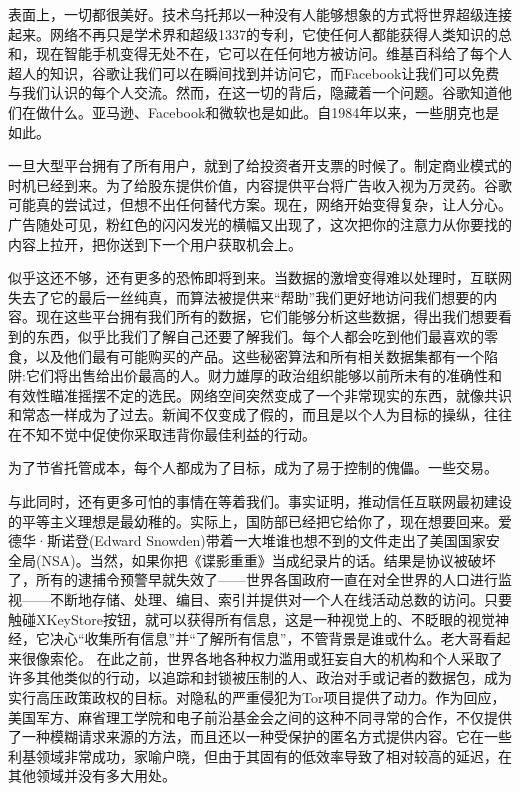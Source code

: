 表面上，一切都很美好。技术乌托邦以一种没有人能够想象的方式将世界超级连接起来。网络不再只是学术界和超级1337的专利，它使任何人都能获得人类知识的总和，现在智能手机变得无处不在，它可以在任何地方被访问。维基百科给了每个人超人的知识，谷歌让我们可以在瞬间找到并访问它，而Facebook让我们可以免费与我们认识的每个人交流。然而，在这一切的背后，隐藏着一个问题。谷歌知道他们在做什么。亚马逊、Facebook和微软也是如此。自1984年以来，一些朋克也是如此。

一旦大型平台拥有了所有用户，就到了给投资者开支票的时候了。制定商业模式的时机已经到来。为了给股东提供价值，内容提供平台将广告收入视为万灵药。谷歌可能真的尝试过，但想不出任何替代方案。现在，网络开始变得复杂，让人分心。广告随处可见，粉红色的闪闪发光的横幅又出现了，这次把你的注意力从你要找的内容上拉开，把你送到下一个用户获取机会上。

似乎这还不够，还有更多的恐怖即将到来。当数据的激增变得难以处理时，互联网失去了它的最后一丝纯真，而算法被提供来“帮助”我们更好地访问我们想要的内容。现在这些平台拥有我们所有的数据，它们能够分析这些数据，得出我们想要看到的东西，似乎比我们了解自己还要了解我们。每个人都会吃到他们最喜欢的零食，以及他们最有可能购买的产品。这些秘密算法和所有相关数据集都有一个陷阱:它们将出售给出价最高的人。财力雄厚的政治组织能够以前所未有的准确性和有效性瞄准摇摆不定的选民。网络空间突然变成了一个非常现实的东西，就像共识和常态一样成为了过去。新闻不仅变成了假的，而且是以个人为目标的操纵，往往在不知不觉中促使你采取违背你最佳利益的行动。

为了节省托管成本，每个人都成为了目标，成为了易于控制的傀儡。一些交易。

与此同时，还有更多可怕的事情在等着我们。事实证明，推动信任互联网最初建设的平等主义理想是最幼稚的。实际上，国防部已经把它给你了，现在想要回来。爱德华·斯诺登(Edward Snowden)带着一大堆谁也想不到的文件走出了美国国家安全局(NSA)。当然，如果你把《谍影重重》当成纪录片的话。结果是协议被破坏了，所有的逮捕令预警早就失效了——世界各国政府一直在对全世界的人口进行监视——不断地存储、处理、编目、索引并提供对一个人在线活动总数的访问。只要触碰XKeyStore按钮，就可以获得所有信息，这是一种视觉上的、不眨眼的视觉神经，它决心“收集所有信息”并“了解所有信息”，不管背景是谁或什么。老大哥看起来很像索伦。
在此之前，世界各地各种权力滥用或狂妄自大的机构和个人采取了许多其他类似的行动，以追踪和封锁被压制的人、政治对手或记者的数据包，成为实行高压政策政权的目标。对隐私的严重侵犯为Tor项目提供了动力。作为回应，美国军方、麻省理工学院和电子前沿基金会之间的这种不同寻常的合作，不仅提供了一种模糊请求来源的方法，而且还以一种受保护的匿名方式提供内容。它在一些利基领域非常成功，家喻户晓，但由于其固有的低效率导致了相对较高的延迟，在其他领域并没有多大用处。

